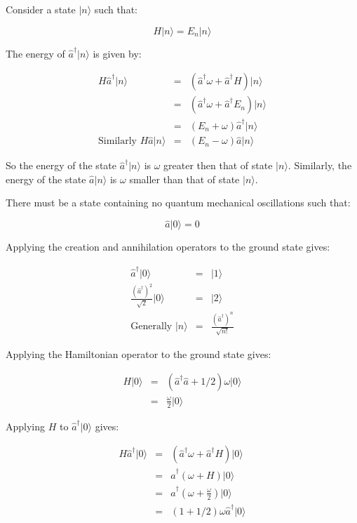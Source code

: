Consider a state $|n\rangle$ such that:

\[
  H|n\rangle = E_n |n\rangle
\]

The energy of $\hat{a}^{\dagger}|n\rangle$ is given by:

\begin{eqnarray*}
  H\hat{a}^{\dagger} |n\rangle & = & \left(\hat{a}^{\dagger}\omega + \hat{a}^{\dagger}H\right)|n\rangle \\
  & = & \left(\hat{a}^{\dagger}\omega + \hat{a}^{\dagger}E_n\right)|n\rangle \\
  & = & \left(E_n + \omega\right)\hat{a}^{\dagger}|n\rangle \\
  \textrm{Similarly } H\hat{a}|n\rangle & = & \left(E_n - \omega\right)\hat{a}|n\rangle
\end{eqnarray*}

So the energy of the state $\hat{a}^{\dagger}|n\rangle$ is $\omega$ greater then that of state $|n\rangle$.  Similarly, the energy of the state $\hat{a}|n\rangle$ is $\omega$ smaller than that of state $|n\rangle$.

There must be a state containing no quantum mechanical oscillations such that:

\[
  \hat{a}|0\rangle = 0
\]

Applying the creation and annihilation operators to the ground state gives:

\begin{eqnarray*}
  \hat{a}^{\dagger}|0\rangle & = & |1\rangle \\
  \frac{\left(\hat{a}^{\dagger}\right)^2}{\sqrt{2}}|0\rangle & = & |2\rangle \\
  \textrm{Generally } |n\rangle & = & \frac{\left(\hat{a}^{\dagger}\right)^n}{\sqrt{n!}}
\end{eqnarray*}

Applying the Hamiltonian operator to the ground state gives:

\begin{eqnarray*}
  H|0\rangle & = & \left(\hat{a}^{\dagger}\hat{a} + 1/2\right)\omega|0\rangle \\
  & = & \frac{\omega}{2}|0\rangle
\end{eqnarray*}

Applying $H$ to $\hat{a}^{\dagger}|0\rangle$ gives:

\begin{eqnarray*}
  H \hat{a}^{\dagger}|0\rangle & = & \left( \hat{a}^{\dagger}\omega + \hat{a}^{\dagger} H\right) |0\rangle \\
  & = & \hat{a}^{\dagger}\left( \omega + H \right) |0\rangle \\
  & = & \hat{a}^{\dagger} \left( \omega + \frac{\omega}{2}\right)|0\rangle \\
  & = & \left(1 + 1/2\right)\omega\hat{a}^{\dagger}|0\rangle
\end{eqnarray*}

